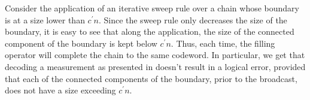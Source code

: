 \begin{remark}
Consider the application of an iterative sweep rule over a chain whose boundary is at a size lower than $c^{\prime} n$. Since the sweep rule only decreases the size of the boundary, it is easy to see that along the application, the size of the connected component of the boundary is kept below $c^{\prime}n$. Thus, each time, the filling operator will complete the chain to the same codeword. In particular, we get that decoding a measurement as presented in  doesn't result in a logical error, provided that each of the connected components of the boundary, prior to the broadcast, does not have a size exceeding $c^{\prime}n$.
\end{remark}



%
%
